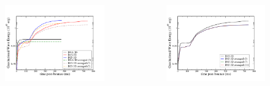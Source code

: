 \documentclass[aspectratio=169]{beamer}
\begin{document}
\begin{frame}

  \begin{columns}[c]

    \begin{figure}
      \includegraphics[width=1.0\textwidth]{Figures/Energy_all.pdf}
    \end{figure}

    \begin{figure}
      \includegraphics[width=1.0\textwidth]{Figures/Energy_D15.pdf}
    \end{figure}

  \end{columns}

\end{frame}
\end{document}
